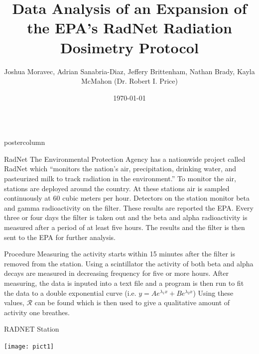 \documentclass[final,11pt]{beamer}
\title{Data Analysis of an Expansion of the EPA’s RadNet Radiation Dosimetry Protocol}
\author{Joshua Moravec, Adrian Sanabria-Diaz, Jeffery Brittenham, Nathan Brady, Kayla McMahon (Dr. Robert I. Price)}
\institute[University of Nebraska at Kearney]{Physics Department, University of Nebraska at Kearney, Kearney, Nebraska}
\date[\today]{\today}
\newlength{\columnheight}
\begin{document}
\begin{frame}
	\begin{columns}
		\begin{column}{.30\textwidth}
			\begin{beamercolorbox}[center,wd=\textwidth]{postercolumn}
				\begin{minipage}[T]{.95\textwidth}
					\parbox[t][\columnheight]{\textwidth}{
						\begin{block}{RadNet}
					\small	The Environmental Protection Agency has a nationwide project called RadNet which ``monitors the nation's air, precipitation, drinking water, and pasteurized milk to track radiation in the environment.'' To monitor the air, stations are deployed around the country. At these stations air is sampled continuously at 60 cubic meters per hour. Detectors on the station monitor beta and gamma radioactivity on the filter. These results are reported the EPA. Every three or four days the filter is taken out and the beta and alpha radioactivity is measured after a period of at least five hours. The results and the filter is then sent to the EPA for further analysis.
						\end{block}
						\begin{block}{Procedure}
						\footnotesize Measuring the activity starts within 15 minutes after the filter is removed from the station. Using a scintillator the activity of both beta and alpha decays are measured in decreasing frequency for five or more hours. After measuring, the data is inputed into a text file and a program is then run to fit the data to a double exponential curve (i.e. $y = Ae^{\lambda_1 x} + Be^{\lambda_2 x}$) Using these values, $\mathcal{R}$ can be found which is then used to give a qualitative amount of activity one breathes.
						\end{block}

						\begin{block}{RADNET Station}
						\begin{center}
						\texttt{[image: pict1]}
						\end{center}
						\end{block}
						\vfill
					}
				\end{minipage}
			\end{beamercolorbox}
		\end{column}


\end{columns}
\end{frame}
\end{document}
